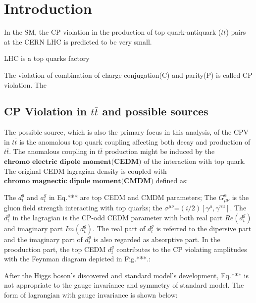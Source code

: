 

\section{Introduction}
\label{sec:Introduction}


	In the SM, the CP violation in the production of top quark-antiquark ($t\bar{t}$) pairs at the CERN LHC is predicted to be very small.
	
	LHC is a top quarks factory


	The violation of combination of charge conjugation(C) and parity(P) is called CP violation. The 


	\subsection{CP Violation in $t\bar{t}$ and possible sources}
	\label{ssec:Intro_CPVpossible}

	The possible source, which is also the primary focus in this analysis, of the CPV in $t\bar{t}$ is the anomalous top quark coupling affecting both decay and production of $t\bar{t}$. The anomalous coupling in $t\bar{t}$ production might be induced by the $\textbf{chromo electric dipole moment(CEDM)}$ of the interaction with top quark. The original CEDM lagragian density is coupled with $\textbf{chromo magnectic dipole moment(CMDM)}$ defined as:


	The $d_t^g$ and $a_t^g$ in Eq.*** are top CEDM and CMDM parameters; The $G^a_{\mu \nu}$ is the gluon field strength interacting with top quarks; the $\sigma^{\mu \nu}$=$(i/2) [\gamma^{\mu},\gamma^{nu}]$.
	The $d_t^g$ in the lagragian is the CP-odd CEDM parameter with both real part $Re(d_t^g)$ and imaginary part $Im(d_t^g)$. \cite{Zhou:1998wz} The real part of $d_t^g$ is referred to the dipersive part and the imaginary part of $d_t^g$ is also regarded as absorptive part. In the prooduction part, the top CEDM $d_t^g$ contributes to the CP violating amplitudes with the Feynman diagram depicted in Fig.***.:


	After the Higgs boson's discovered and standard model's development, Eq.*** is not appropriate to the gauge invariance and symmetry of standard model. The form of lagrangian with gauge invariance is shown below:


